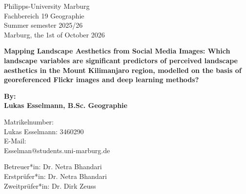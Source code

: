 \begin{titlepage}
    \begin{minipage}[t]{0.4\textwidth}
        \raggedright
        
        \large
        Philipps-University Marburg\\
        Fachbereich 19 Geographie\\
        Summer semester 2025/26\\
        Marburg, the 1st of October 2026\\
    
    \end{minipage}
    \hfill
    \begin{minipage}[t]{0.6\textwidth}
        \raggedleft
    
        \large
        
        
    \end{minipage}
    \begin{center}

        \vspace*{5cm}

        \huge
        
        \textbf{Mapping Landscape Aesthetics from Social Media Images: Which landscape variables are significant predictors of perceived landscape aesthetics in the Mount Kilimanjaro region, modelled on the basis of georeferenced Flickr images and deep learning methods?
}
        \vspace{1cm}
        
        \Large
        
        \textbf{By:\\Lukas Esselmann, B.Sc. Geographie}
        
        \vspace{2.5cm}
        
    \end{center}
    \begin{minipage}[t]{0.7\textwidth}
    
        \vspace{2cm}
        
        \large
        
        Matrikelnumber:\\Lukas Esselmann: 3460290
        \vspace{0.3cm}
        \\E-Mail:\\Esselman@students.uni-marburg.de\\
        
        \vspace{0.3cm}
        
        Betreuer*in: Dr. Netra Bhandari
        \\Erstprüfer*in: Dr. Netra Bhandari
        \\Zweitprüfer*in: Dr. Dirk Zeuss
        
    \end{minipage}
    
\end{titlepage}